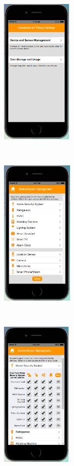 \begin{figure}
	\centering
	\begin{subfigure}[t]{0.24\textwidth}
		\centering
		\includegraphics[height=2.8in]{figures/ui1sd1.png}
	\end{subfigure}%
	~
	\begin{subfigure}[t]{0.24\textwidth}
		\centering
		\includegraphics[height=2.8in]{figures/ui1sd2.png}
	\end{subfigure}%
	~
	\begin{subfigure}[t]{0.24\textwidth}
		\centering
		\includegraphics[height=2.8in]{figures/ui1sd3.png}

\end{subfigure}
\end{figure}
